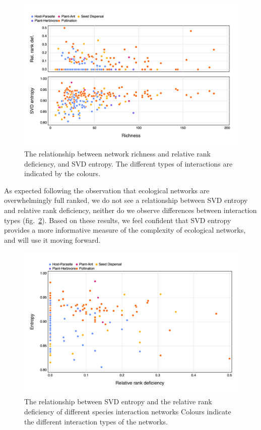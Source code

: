 \documentclass[11pt]{article}
\makeatletter
\def\maxwidth{\ifdim\Gin@nat@width>\linewidth\linewidth
\else\Gin@nat@width\fi}
\let\Oldincludegraphics\includegraphics
\renewcommand{\includegraphics}[1]{\Oldincludegraphics[width=\maxwidth]{#1}}
\makeatother
\begin{document}
\begin{figure}
\hypertarget{fig:size}{%
\centering
\includegraphics{figures/size_v_rankentropy.png}
\caption{The relationship between network richness and relative rank
deficiency, and SVD entropy. The different types of interactions are
indicated by the colours.}\label{fig:size}
}
\end{figure}

As expected following the observation that ecological networks are
overwhelmingly full ranked, we do not see a relationship between SVD
entropy and relative rank deficiency, neither do we observe differences
between interaction types (fig.~\ref{fig:entropy_v_rank}). Based on
these results, we feel confident that SVD entropy provides a more
informative measure of the complexity of ecological networks, and will
use it moving forward.

\begin{figure}
\hypertarget{fig:entropy_v_rank}{%
\centering
\includegraphics{figures/entropy_v_rank.png}
\caption{The relationship between SVD entropy and the relative rank
deficiency of different species interaction networks Colours indicate
the different interaction types of the
networks.}\label{fig:entropy_v_rank}
}
\end{figure}
\end{document}
